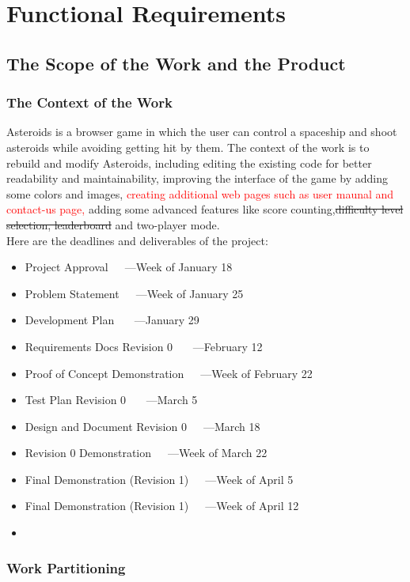 \documentclass[12pt, titlepage]{article}
\begin{document}
\section{Functional Requirements}

\subsection{The Scope of the Work and the Product}

\subsubsection{The Context of the Work}
Asteroids is a browser game in which the user can control a spaceship and shoot asteroids while avoiding getting hit by them. The context of the work is to rebuild and modify Asteroids, including editing the existing code for better readability and maintainability, improving the interface of the game by adding some colors and images,  \textcolor{red}{creating additional web pages such as user maunal and contact-us page, }adding some advanced features like score counting,\sout{difficulty level selection, leaderboard} and two-player mode.\\
Here are the deadlines and deliverables of the project:
\begin{itemize}
\item Project Approval~~~---Week of January 18
\item Problem Statement~~~---Week of January 25
\item Development Plan~~~ ---January 29
\item Requirements Docs Revision 0~~~ ---February 12
\item Proof of Concept Demonstration~~~---Week of February 22
\item Test Plan Revision 0~~~ ---March 5
\item Design and Document Revision 0~~~---March 18
\item Revision 0 Demonstration~~~---Week of March 22
\item Final Demonstration (Revision 1)~~~---Week of April 5
\item Final Demonstration (Revision 1)~~~---Week of April 12

\item 

\end{itemize}

\subsubsection{Work Partitioning}
\end{document}
